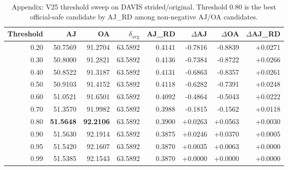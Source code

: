 \begin{table}[t]
\centering
\caption{Appendix: V25 threshold sweep on DAVIS strided/original. Threshold $0.80$ is the best official-safe candidate by AJ\_RD among non-negative AJ/OA candidates.}
\label{tab:v25_threshold_sweep_appendix}
\small
\begin{adjustbox}{max width=\textwidth}
\begin{tabular}{rrrrrrrr}
\toprule
Threshold & AJ & OA & $\delta_{\mathrm{avg}}$ & AJ\_RD & $\Delta$AJ & $\Delta$OA & $\Delta$AJ\_RD \\
\midrule
0.20 & 50.7569 & 91.2704 & 63.5892 & 0.4141 & -0.7816 & -0.8839 & +0.0271 \\
0.30 & 50.8000 & 91.2821 & 63.5892 & 0.4136 & -0.7384 & -0.8722 & +0.0266 \\
0.40 & 50.8522 & 91.3187 & 63.5892 & 0.4131 & -0.6863 & -0.8357 & +0.0261 \\
0.50 & 50.9103 & 91.4152 & 63.5892 & 0.4118 & -0.6282 & -0.7391 & +0.0248 \\
0.60 & 51.0521 & 91.6501 & 63.5892 & 0.4092 & -0.4864 & -0.5043 & +0.0222 \\
0.70 & 51.3570 & 91.9982 & 63.5892 & 0.3988 & -0.1815 & -0.1562 & +0.0118 \\
0.80 & \textbf{51.5648} & \textbf{92.2106} & 63.5892 & 0.3900 & +0.0263 & +0.0563 & +0.0030 \\
0.90 & 51.5630 & 92.1914 & 63.5892 & 0.3875 & +0.0246 & +0.0370 & +0.0005 \\
0.95 & 51.5420 & 92.1607 & 63.5892 & 0.3870 & +0.0035 & +0.0063 & +0.0000 \\
0.99 & 51.5385 & 92.1543 & 63.5892 & 0.3870 & +0.0000 & +0.0000 & +0.0000 \\
\bottomrule
\end{tabular}
\end{adjustbox}
\end{table}
